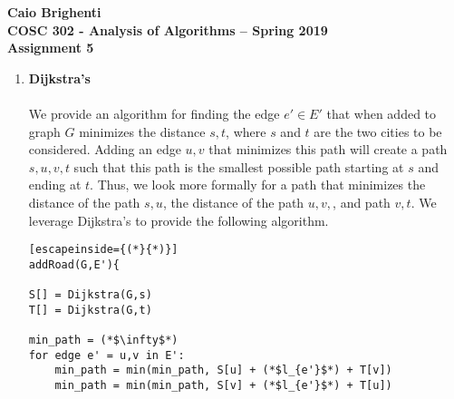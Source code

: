 \documentclass{article}
\begin{document}
\noindent \textbf{Caio Brighenti }\\
\noindent \textbf{COSC 302 - Analysis of Algorithms -- Spring 2019}\\%
\noindent \textbf{Assignment 5}\vspace{1em}\\
\begin{enumerate}
	\item \textbf{Dijkstra's}
	\\ \\ We provide an algorithm for finding the edge $e' \in E'$ that when added to graph $G$ minimizes the distance $s,t$, where $s$ and $t$ are the two cities to be considered. Adding an edge $u,v$ that minimizes this path will create a path $s,u,v,t$ such that this path is the smallest possible path starting at $s$ and ending at $t$. Thus, we look more formally for a path that minimizes the distance of the path $s,u$, the distance of the path $u,v,$, and path $v,t$. We leverage Dijkstra's to provide the following algorithm.
	\begin{lstlisting}[escapeinside={(*}{*)}]
addRoad(G,E'){

S[] = Dijkstra(G,s)
T[] = Dijkstra(G,t)

min_path = (*$\infty$*)
for edge e' = u,v in E':
	min_path = min(min_path, S[u] + (*$l_{e'}$*) + T[v]) 
	min_path = min(min_path, S[v] + (*$l_{e'}$*) + T[u])


\end{lstlisting}
\end{enumerate}
\end{document}
